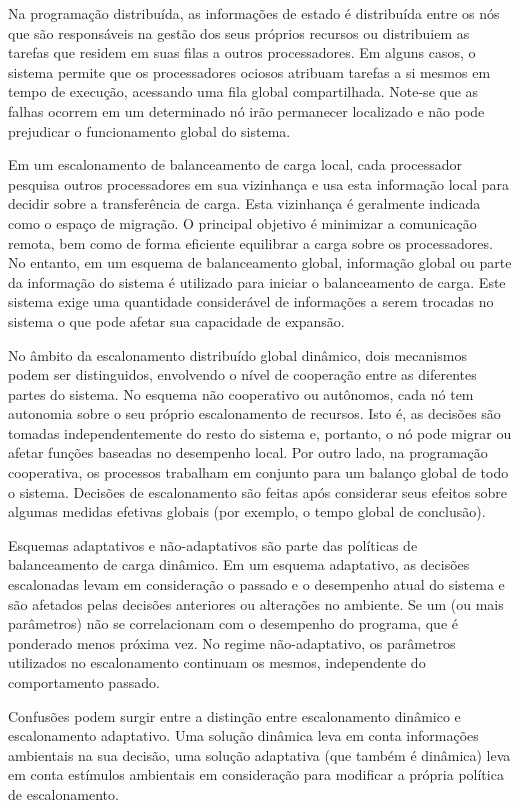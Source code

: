 Na programação distribuída, as informações de estado é distribuída entre os nós que são responsáveis na gestão dos seus próprios recursos ou distribuiem as tarefas que residem em suas filas a outros processadores. Em alguns casos, o sistema permite que os processadores ociosos atribuam tarefas a si mesmos em tempo de execução, acessando uma fila global compartilhada. Note-se que as falhas ocorrem em um determinado nó irão permanecer localizado e não pode prejudicar o funcionamento global do sistema. 

Em um escalonamento de balanceamento de carga local, cada processador pesquisa outros processadores em sua vizinhança e usa esta informação local para decidir sobre a transferência de carga. Esta vizinhança é geralmente indicada como o espaço de migração. O principal objetivo é minimizar a comunicação remota, bem como de forma eficiente equilibrar a carga sobre os processadores. No entanto, em um esquema de balanceamento global, informação global ou  parte da informação do sistema é utilizado para iniciar o balanceamento de carga. Este sistema exige uma quantidade considerável de informações a serem trocadas no sistema o que pode afetar sua capacidade de expansão.

No âmbito da escalonamento distribuído global dinâmico, dois mecanismos podem ser distinguidos, envolvendo o nível de cooperação entre as diferentes partes do sistema. No esquema não cooperativo ou autônomos, cada nó tem autonomia sobre o seu próprio escalonamento de recursos. Isto é, as decisões são tomadas independentemente do resto do sistema e, portanto, o nó pode migrar ou afetar funções baseadas no desempenho local. Por outro lado, na programação cooperativa, os processos trabalham em conjunto para um balanço global de todo o sistema. Decisões de escalonamento são feitas após considerar seus efeitos sobre algumas medidas efetivas globais (por exemplo, o tempo global de conclusão).

Esquemas adaptativos e não-adaptativos são parte das políticas de balanceamento de carga dinâmico. Em um esquema adaptativo, as decisões escalonadas levam em consideração o passado e o desempenho atual do sistema e são afetados pelas decisões anteriores ou alterações no ambiente. Se um (ou mais parâmetros) não se correlacionam com o desempenho do programa, que é ponderado menos próxima vez. No regime não-adaptativo, os parâmetros utilizados no escalonamento continuam os mesmos, independente do comportamento passado. 
	
Confusões podem surgir entre a distinção entre escalonamento dinâmico e escalonamento adaptativo. Uma solução dinâmica leva em conta informações ambientais na sua decisão, uma solução adaptativa (que também é dinâmica) leva em conta estímulos ambientais em consideração para modificar a própria política de escalonamento.



